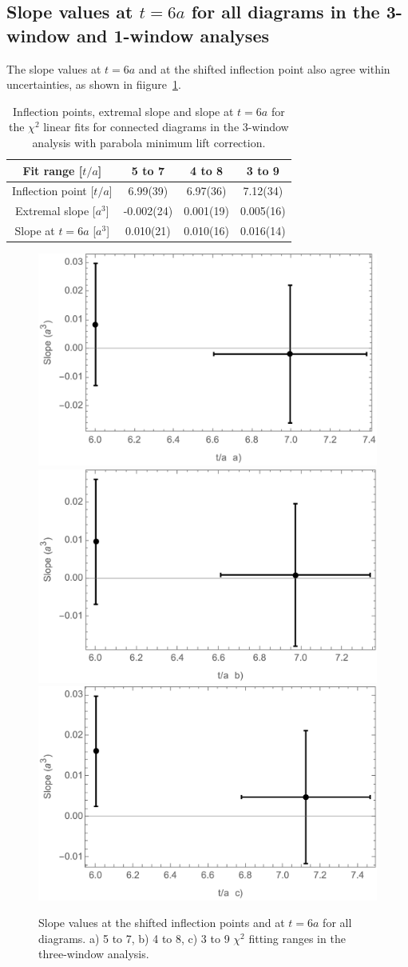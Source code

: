 \subsection{Slope values at $t=6a$ for all diagrams in the 3-window and
1-window  analyses}
The slope values at $t=6a$ and at the shifted inflection point also agree within uncertainties, 
as shown in fiigure~\ref{fig:shiftinflec_all}.
\begin{table}[H]
\begin{center}
    \begin{tabular}{ | c | c | c | c |}
    \hline
     Fit range [$t/a$] & 5 to 7    & 4 to 8 & 3 to 9      \\ 
     \hline
   	Inflection point [$t/a$] &   6.99(39)         &      6.97(36)    &    7.12(34)   \\ \hline
        Extremal slope [$a^3$] &    -0.002(24)        &     0.001(19)    &      0.005(16) \\ \hline
 	Slope at $t=6a$ [$a^3$] &    0.010(21)        &     0.010(16)   &     0.016(14)   \\ \hline
    \end{tabular}
\end{center}
\caption{Inflection points, extremal slope and slope at $t=6a$ for the $\chi^2$
linear fits for connected diagrams in the 3-window analysis with parabola minimum lift correction.}
\label{tab:Retardation3wMultiPointAll}
\end{table}
\begin{figure}[H]
  \includegraphics[width=.33\linewidth]{figures/3wF5-7Chi.png}
  \includegraphics[width=.325\linewidth]{figures/3wF4-8Chi.png}
  \includegraphics[width=.325\linewidth]{figures/3wF3-9Chi.png}
  \caption{Slope values at the shifted inflection points and at $t=6a$ for all diagrams. a) 5 to 7, 
  b) 4 to 8, c) 3 to 9 $\chi^2$ fitting ranges in the three-window analysis.}
  \label{fig:shiftinflec_all}
\end{figure}
